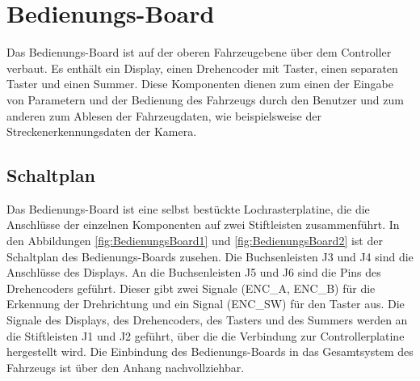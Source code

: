 

\pagestyle{fancy}
\rhead{\thepage} \chead{} 
\cfoot{}



\section{Bedienungs-Board}\label{Sec6}

Das Bedienungs-Board ist auf der oberen Fahrzeugebene über dem Controller verbaut. Es enthält ein Display, einen Drehencoder mit Taster, einen separaten Taster und einen Summer. Diese Komponenten dienen zum einen der Eingabe von Parametern und der Bedienung des Fahrzeugs durch den Benutzer und zum anderen zum Ablesen der Fahrzeugdaten, wie beispielsweise der Streckenerkennungsdaten der Kamera.

\subsection{Schaltplan}\label{Sec6Sub1}

Das Bedienungs-Board ist eine selbst bestückte Lochrasterplatine, die die Anschlüsse der einzelnen Komponenten auf zwei Stiftleisten zusammenführt. In den Abbildungen \ref{fig:BedienungsBoard1} und \ref{fig:BedienungsBoard2} ist der Schaltplan des Bedienungs-Boards zusehen. Die Buchsenleisten J3 und J4 sind die Anschlüsse des Displays. An die Buchsenleisten J5 und J6 sind die Pins des Drehencoders geführt. Dieser gibt zwei Signale (ENC\_A, ENC\_B) für die Erkennung der Drehrichtung und ein Signal (ENC\_SW) für den Taster aus. Die Signale des Displays, des Drehencoders, des Tasters und des Summers werden an die Stiftleisten J1 und J2 geführt, über die die Verbindung zur Controllerplatine hergestellt wird. Die Einbindung des Bedienungs-Boards in das Gesamtsystem des Fahrzeugs ist über den Anhang \glqq{}\grqq{} nachvollziehbar.

